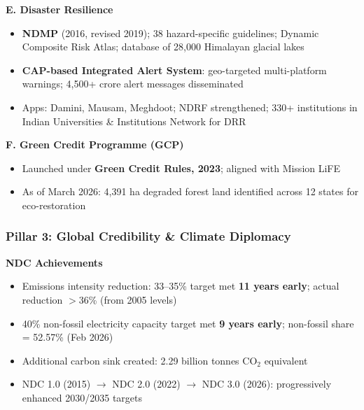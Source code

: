 \textbf{E. Disaster Resilience}
\begin{itemize}
  \item \textbf{NDMP} (2016, revised 2019); 38 hazard-specific guidelines; Dynamic Composite Risk Atlas; database of 28,000 Himalayan glacial lakes
  \item \textbf{CAP-based Integrated Alert System}: geo-targeted multi-platform warnings; 4,500+ crore alert messages disseminated
  \item Apps: Damini, Mausam, Meghdoot; NDRF strengthened; 330+ institutions in Indian Universities \& Institutions Network for DRR
\end{itemize}

\textbf{F. Green Credit Programme (GCP)}
\begin{itemize}
  \item Launched under \textbf{Green Credit Rules, 2023}; aligned with Mission LiFE
  \item As of March 2026: 4,391 ha degraded forest land identified across 12 states for eco-restoration
\end{itemize}

\subsubsection*{Pillar 3: Global Credibility \& Climate Diplomacy}

\textbf{NDC Achievements}
\begin{itemize}
  \item Emissions intensity reduction: 33--35\% target met \textbf{11 years early}; actual reduction $>$36\% (from 2005 levels)
  \item 40\% non-fossil electricity capacity target met \textbf{9 years early}; non-fossil share = 52.57\% (Feb 2026)
  \item Additional carbon sink created: 2.29 billion tonnes CO$_2$ equivalent
  \item NDC 1.0 (2015) $\to$ NDC 2.0 (2022) $\to$ NDC 3.0 (2026): progressively enhanced 2030/2035 targets
\end{itemize}

